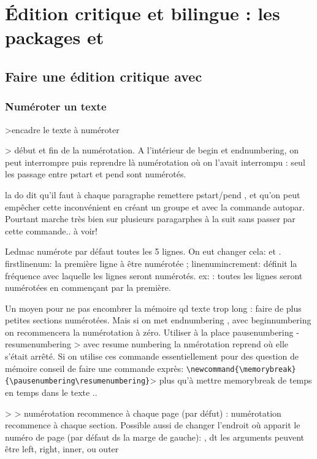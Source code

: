 \chapter{Édition critique et bilingue : les packages  et }\label{ledmac}

\section{Faire une édition critique avec }

\subsection{Numéroter un texte}

>encadre le texte à numéroter

> début et fin de la numérotation. A l'intérieur de begin et endnumbering,  on peut interrompre puis reprendre là numérotation où on l'avait interrompu : seul les passage entre pstart et pend sont numérotés.

la do dit qu'il faut à chaque paragraphe remettere pstart/pend , et qu'on peut empêcher cette inconvénient en créant un groupe et avec la commande autopar. Pourtant marche très bien sur plusieurs paragarphes à la suit sans passer par cette commande.. à voir!


Ledmac numérote par défaut toutes les 5 lignes. On eut changer cela:
 et .
firstlinenum: la première ligne à être numérotée ; linenumincrement: définit la fréquence avec laquelle les lignes seront numérotés. ex:   : toutes les lignes seront numérotées en commençant par la première. 

Un moyen pour ne pas encombrer la mémoire qd texte trop long : faire de plus petites sections numérotées. Mais si on met endnumbering ,  avec beginnumbering on recommencera la numérotation à zéro.  Utiliser à la place pausenumbering - resumenumbering > avec resume numbering la nmérotation reprend où elle s'était arrêté. Si on utilise ces commande essentiellement pour des question de mémoire conseil de faire une commande exprès: \verb|\newcommand{\memorybreak}{\pausenumbering\resumenumbering}|> plus qu'à mettre memorybreak de temps en temps dans le texte ..

 >  > numérotation recommence à chaque page  (par défut) : numérotation recommence à chaque section.
Possible aussi de changer l'endroit où apparit le numéro de page (par défaut ds la marge de gauche): , dt les arguments peuvent être left, right, inner, ou outer

